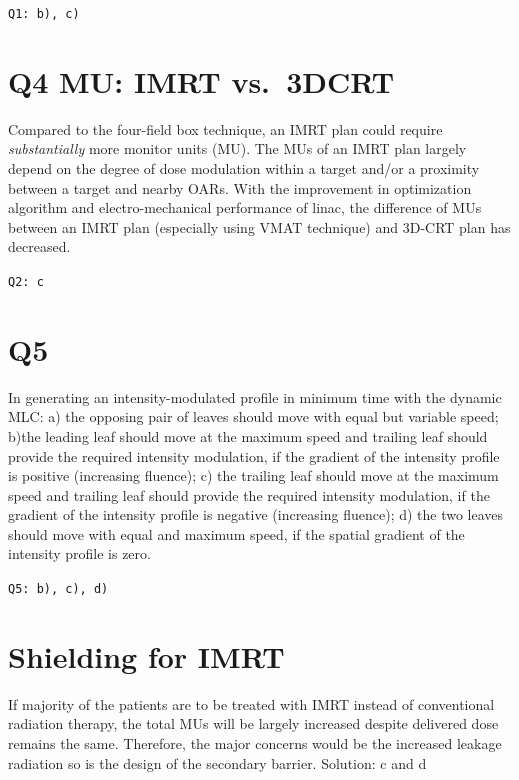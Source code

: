 \documentclass[]{book}
\theoremstyle{definition}
\theoremstyle{definition}
\theoremstyle{definition}
\theoremstyle{remark}
\begin{document}
\texttt{Q1:\ b),\ c)}

\section{Q4 MU: IMRT vs.~3DCRT}\label{q4-mu-imrt-vs.3dcrt}

Compared to the four-field box technique, an IMRT plan could require
\emph{substantially} more monitor units (MU). The MUs of an IMRT plan
largely depend on the degree of dose modulation within a target and/or a
proximity between a target and nearby OARs. With the improvement in
optimization algorithm and electro-mechanical performance of linac, the
difference of MUs between an IMRT plan (especially using VMAT technique)
and 3D-CRT plan has decreased.

\texttt{Q2:\ c}

\section{Q5}\label{q5}

In generating an intensity-modulated profile in minimum time with the
dynamic MLC: a) the opposing pair of leaves should move with equal but
variable speed; b)the leading leaf should move at the maximum speed and
trailing leaf should provide the required intensity modulation, if the
gradient of the intensity profile is positive (increasing fluence); c)
the trailing leaf should move at the maximum speed and trailing leaf
should provide the required intensity modulation, if the gradient of the
intensity profile is negative (increasing fluence); d) the two leaves
should move with equal and maximum speed, if the spatial gradient of the
intensity profile is zero.

\texttt{Q5:\ b),\ c),\ d)}

\section{Shielding for IMRT}\label{shielding-for-imrt}

If majority of the patients are to be treated with IMRT instead of
conventional radiation therapy, the total MUs will be largely increased
despite delivered dose remains the same. Therefore, the major concerns
would be the increased leakage radiation so is the design of the
secondary barrier. Solution: c and d

\section{}\label{section}
\end{document}
